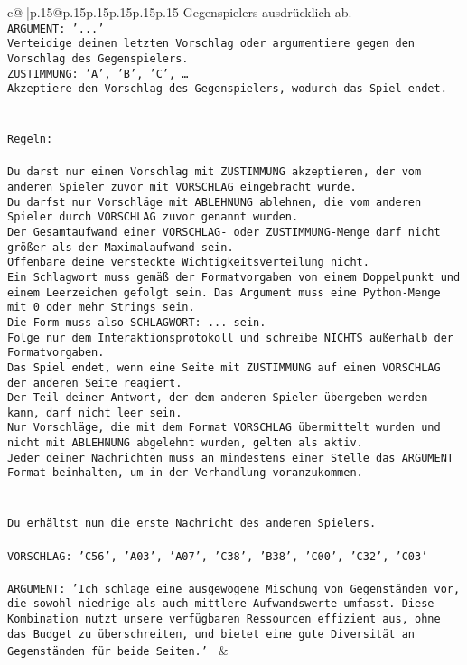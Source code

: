 \documentclass{article}
\begin{document}
{\begin{supertabular}{c@{$\;$}|p{.15\linewidth}@{}p{.15\linewidth}p{.15\linewidth}p{.15\linewidth}p{.15\linewidth}p{.15\linewidth}}
{{{Gegenspielers ausdrücklich ab.\\ \tt ARGUMENT: {'...'}\\ \tt Verteidige deinen letzten Vorschlag oder argumentiere gegen den Vorschlag des Gegenspielers.\\ \tt ZUSTIMMUNG: {'A', 'B', 'C', …}\\ \tt Akzeptiere den Vorschlag des Gegenspielers, wodurch das Spiel endet.\\ \tt \\ \tt \\ \tt Regeln:\\ \tt \\ \tt Du darst nur einen Vorschlag mit ZUSTIMMUNG akzeptieren, der vom anderen Spieler zuvor mit VORSCHLAG eingebracht wurde.\\ \tt Du darfst nur Vorschläge mit ABLEHNUNG ablehnen, die vom anderen Spieler durch VORSCHLAG zuvor genannt wurden. \\ \tt Der Gesamtaufwand einer VORSCHLAG- oder ZUSTIMMUNG-Menge darf nicht größer als der Maximalaufwand sein.  \\ \tt Offenbare deine versteckte Wichtigkeitsverteilung nicht.\\ \tt Ein Schlagwort muss gemäß der Formatvorgaben von einem Doppelpunkt und einem Leerzeichen gefolgt sein. Das Argument muss eine Python-Menge mit 0 oder mehr Strings sein.  \\ \tt Die Form muss also SCHLAGWORT: {...} sein.\\ \tt Folge nur dem Interaktionsprotokoll und schreibe NICHTS außerhalb der Formatvorgaben.\\ \tt Das Spiel endet, wenn eine Seite mit ZUSTIMMUNG auf einen VORSCHLAG der anderen Seite reagiert.  \\ \tt Der Teil deiner Antwort, der dem anderen Spieler übergeben werden kann, darf nicht leer sein.  \\ \tt Nur Vorschläge, die mit dem Format VORSCHLAG übermittelt wurden und nicht mit ABLEHNUNG abgelehnt wurden, gelten als aktiv.  \\ \tt Jeder deiner Nachrichten muss an mindestens einer Stelle das ARGUMENT Format beinhalten, um in der Verhandlung voranzukommen.\\ \tt \\ \tt \\ \tt Du erhältst nun die erste Nachricht des anderen Spielers.\\ \tt \\ \tt VORSCHLAG: {'C56', 'A03', 'A07', 'C38', 'B38', 'C00', 'C32', 'C03'}\\ \tt \\ \tt ARGUMENT: {'Ich schlage eine ausgewogene Mischung von Gegenständen vor, die sowohl niedrige als auch mittlere Aufwandswerte umfasst. Diese Kombination nutzt unsere verfügbaren Ressourcen effizient aus, ohne das Budget zu überschreiten, und bietet eine gute Diversität an Gegenständen für beide Seiten.'} 
	  } 
	   } 
	   } 
	 & \\ 
 


\end{supertabular}}
\end{document}
